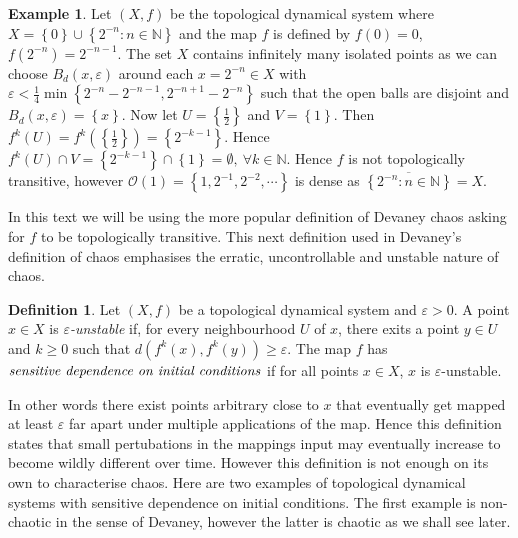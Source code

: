 \documentclass[11pt,a4paper,oneside]{memoir}
\theoremstyle{plain}
\theoremstyle{definition}
\newtheorem{defn}[thm]{Definition}
\newtheorem{exmp}[thm]{Example}
\begin{document}
\begin{exmp}
    Let $(X, f)$ be the topological dynamical system where $X = \left\lbrace 0 \right\rbrace \cup \left\lbrace 2^{-n} : n \in \mathbb{N} \right\rbrace$ and the map $f$ is defined by $f(0) = 0$, $f(2^{-n}) = 2^{-n-1}$. The set $X$ contains infinitely many isolated points as we can choose $B_d(x, \varepsilon)$ around each $x = 2^{-n} \in X$ with $\varepsilon < \frac{1}{4} \min\left\lbrace 2^{-n} - 2^{-n-1}, 2^{-n + 1} - 2^{-n} \right\rbrace$ such that the open balls are disjoint and $B_d(x, \varepsilon) = \left\lbrace x \right\rbrace$. Now let $U = \left\lbrace \frac{1}{2} \right\rbrace$ and $V = \left\lbrace 1 \right\rbrace$. Then $f^k(U) = f^k(\left\lbrace \frac{1}{2} \right\rbrace) = \left\lbrace 2^{-k-1} \right\rbrace$. Hence $f^k(U) \cap V = \left\lbrace 2^{-k-1} \right\rbrace \cap \left\lbrace 1 \right\rbrace = \emptyset, \ \forall k \in \mathbb{N}$. Hence $f$ is not topologically transitive, however $\mathcal{O}(1) = \left\lbrace 1, 2^{-1}, 2^{-2}, \cdots \right\rbrace$ is dense as $\overline{\left\lbrace2^{-n}: n \in \mathbb{N}\right\rbrace} = X$.
\end{exmp}

In this text we will be using the more popular definition of Devaney chaos asking for $f$ to be topologically transitive. This next definition used in Devaney's definition of chaos emphasises the erratic, uncontrollable and unstable nature of chaos.

\begin{defn}\label{defn:sdic}
    Let $(X, f)$ be a topological dynamical system and $\varepsilon > 0$. A point $x \in X$ is \emph{$\varepsilon$-unstable} if, for every neighbourhood $U$ of $x$, there exits a point $y \in U$ and $k \geq 0$ such that $d\left(f^k(x), f^k(y)\right) \geq \varepsilon$. The map $f$ has $\emph{sensitive dependence on initial conditions}$ if for all points $x \in X$, $x$ is $\varepsilon$-unstable.
\end{defn}

In other words there exist points arbitrary close to $x$ that eventually get mapped at least $\varepsilon$ far apart under multiple applications of the map. Hence this definition states that small pertubations in the mappings input may eventually increase to become wildly different over time. However this definition is not enough on its own to characterise chaos. Here are two examples of topological dynamical systems with sensitive dependence on initial conditions. The first example is non-chaotic in the sense of Devaney, however the latter is chaotic as we shall see later.
\end{document}
